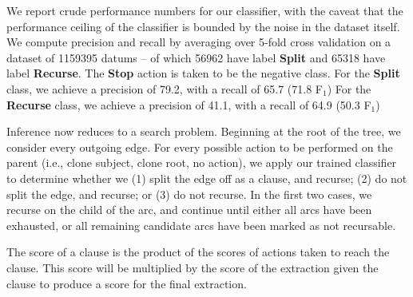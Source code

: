 We report crude performance numbers for our classifier, with the
  caveat that the performance ceiling of the classifier is bounded by the
  noise in the dataset itself.
We compute precision and recall by averaging
  over 5-fold cross validation on a dataset of
  \num{1159395} datums -- of which \num{56962} have label \textbf{Split} and
  \num{65318} have label \textbf{Recurse}.
The \textbf{Stop} action is taken to be the negative class.
For the \textbf{Split} class, we achieve a precision of 79.2, with a recall
  of 65.7 (71.8 F$_1$)
For the \textbf{Recurse} class, we achieve a precision of 41.1, with a recall
  of 64.9 (50.3 F$_1$)

Inference now reduces to a search problem.
Beginning at the root of the tree, we consider every outgoing edge.
  For every possible action to be performed on the parent (i.e., clone subject,
  clone root, no action), we apply our trained classifier to determine
  whether we 
  (1) split the edge off as a clause, and recurse;
  (2) do not split the edge, and recurse; or 
  (3) do not recurse.
In the first two cases, we recurse on the child of the arc, and continue until
  either all arcs have been exhausted, or all remaining candidate arcs
  have been marked as not recursable.

The score of a clause is the product of the scores of actions taken to reach
  the clause.
This score will be multiplied by the score of the extraction given the clause
  to produce a score for the final extraction.
